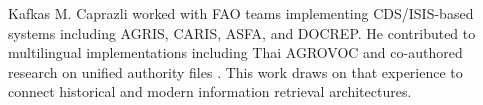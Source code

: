 \documentclass[manuscript,screen,nonacm]{acmart}
\begin{document}



\begin{acks}
Kafkas M. Caprazli worked with FAO teams implementing CDS/ISIS-based systems including AGRIS, CARIS, ASFA, and DOCREP. He contributed to multilingual implementations including Thai AGROVOC and co-authored research on unified authority files \cite{caprazli2003}. This work draws on that experience to connect historical and modern information retrieval architectures.
\end{acks}
\end{document}
